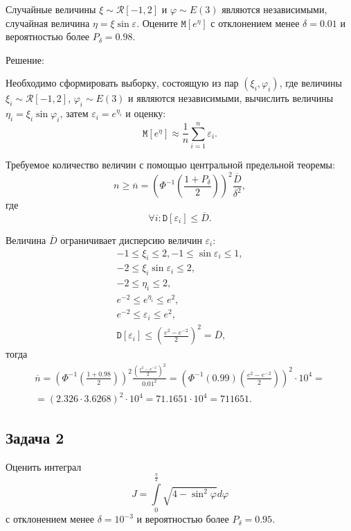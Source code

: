 \documentclass[a4paper,12pt]{article}
\newcommand{\expectation}[1]{\texttt{M} \left[ #1 \right]}
\newcommand{\variance}[1]{\texttt{D} \left[ #1 \right]}
\begin{document}
Случайные величины $\xi \sim \mathcal{R}[-1, 2]$ и $\varphi \sim E(3)$ являются независимыми, случайная величина $\eta = \xi \sin \varepsilon$.
Оцените $\expectation{e^\eta}$ с отклонением менее $\delta = 0.01$ и вероятностью более $P_\delta = 0.98$.

Решение:

Необходимо сформировать выборку, состоящую из пар $(\xi_i, \varphi_i)$, где величины $\xi_i \sim \mathcal{R}[-1, 2]$,
$\varphi_i \sim E(3)$ и являются независимыми, вычислить величины $\eta_i = \xi_i \sin \varphi_i$, затем $\varepsilon_i = e^{\eta_i}$ и оценку:
\[
    \expectation{e^\eta} \approx \frac{1}{n} \sum_{i=1}^n \varepsilon_i.
\]

Требуемое количество величин с помощью центральной предельной теоремы:
\[
    n
    \ge \overline{n}
    = \left( \Phi^{-1} \left( \frac{1 + P_\delta}{2} \right) \right)^2 \frac{\overline{D}}{\delta^2},
\]
где
\[
    \forall i: \variance{\varepsilon_i} \le \overline{D} .
\]

Величина $\overline{D}$ ограничивает дисперсию величин $\varepsilon_i$:
\begin{gather*}
    -1 \le \xi_i \le 2, -1 \le \sin \varepsilon_i \le 1, \\
    -2 \le \xi_i \sin \varepsilon_i \le 2, \\
    -2 \le \eta_i \le 2, \\
    e^{-2} \le e^{\eta_i} \le e^2, \\
    e^{-2} \le \varepsilon_i \le e^2, \\
    \variance{\varepsilon_i} \le \left( \frac{e^2 - e^{-2}}{2} \right)^2 = \overline{D} ,
\end{gather*}
тогда
\begin{multline*}
    \overline{n}
    = \left( \Phi^{-1} \left( \frac{1 + 0.98}{2} \right) \right)^2 \frac{\left( \frac{e^2 - e^{-2}}{2} \right)^2}{0.01^2}
    = \left( \Phi^{-1} ( 0.99 ) \left( \frac{e^2 - e^{-2}}{2} \right) \right)^2 \cdot 10^4 = \\
    = \left( 2.326 \cdot 3.6268 \right)^2 \cdot 10^4
    = 71.1651 \cdot 10^4
    = 711 651 .
\end{multline*}

\subsection*{Задача 2}

Оценить интеграл
\[
    J = \int \limits_0^{\frac{\pi}{2}} \sqrt{4 - \sin^2 \varphi} d \varphi
\]
с отклонением менее $\delta = 10^{-3}$ и вероятностью более $P_\delta = 0.95$.
\end{document}

